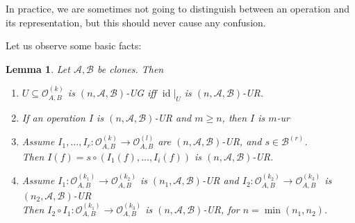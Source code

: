 \documentclass[11pt]{amsart}
\theoremstyle{plain}
\newtheorem{lemma}[thm]{Lemma}
\theoremstyle{definition}
\DeclareMathOperator{\id}{id}
\newcommand{\clone}[1]{\mathcal{#1}}
\newcommand{\clonoid}[1]{\mathcal{#1}}
\newcommand{\clodO}{\clonoid{O}}
\newcommand{\cloA}{\clone{A}}
\newcommand{\cloB}{\clone{B}}
\newcommand{\restrict}[1]{\lvert_{#1}}
\begin{document}
In practice, we are sometimes not going to distinguish between an operation and its representation, but this should never cause any confusion.

Let us observe some basic facts:

\begin{lemma} \label{lemma:urobs}
Let $\cloA, \cloB$ be clones. Then
\begin{enumerate}
\item $U \subseteq \clodO_{A,B}^{(k)}$ is $(n,\cloA,\cloB)$-UG iff $\id\restrict U$ is $(n,\cloA,\cloB)$-UR.
\item If an operation $I$ is $(n,\cloA,\cloB)$-UR and $m \geq n$, then $I$ is $m$-ur
\item Assume $I_1,\ldots,I_r \colon \clodO_{A,B}^{(k)} \to \clodO_{A,B}^{(l)}$ are $(n,\cloA,\cloB)$-UR, and $s \in \cloB^{(r)}$.\\ Then $I(f) = s \circ (I_1(f),\ldots,I_i(f))$ is $(n,\cloA,\cloB)$-UR.
\item Assume $I_1\colon \clodO_{A,B}^{(k_1)} \to \clodO_{A,B}^{(k_2)}$ is $(n_1,\cloA,\cloB)$-UR and $I_2\colon \clodO_{A,B}^{(k_2)} \to \clodO_{A,B}^{(k_3)}$ is $(n_2,\cloA,\cloB)$-UR\\ Then $I_2\circ I_1\colon \clodO_{A,B}^{(k_1)} \to \clodO_{A,B}^{(k_3)}$ is $(n,\cloA,\cloB)$-UR, for $n = \min(n_1,n_2)$.
\end{enumerate}
\end{lemma}
\end{document}
